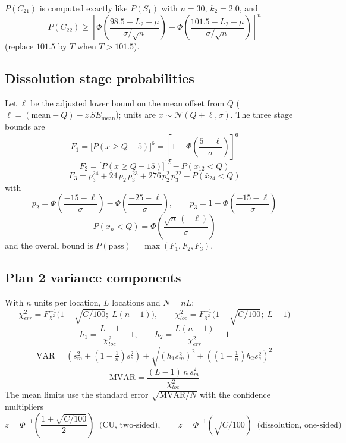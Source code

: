 \documentclass{article}
\begin{document}
$P(C_{21})$ is computed exactly like $P(S_1)$ with $n = 30$, $k_2 = 2.0$, and
$$P(C_{22}) \ge \left[ \Phi\!\left(\frac{98.5 + L_2 - \mu}{\sigma/\sqrt{n}}\right) - \Phi\!\left(\frac{101.5 - L_2 - \mu}{\sigma/\sqrt{n}}\right) \right]^{n}$$
(replace $101.5$ by $T$ when $T > 101.5$).

\subsection*{Dissolution stage probabilities}

Let $\ell$ be the adjusted lower bound on the mean offset from $Q$
($\ell = (\text{mean} - Q) - z\,SE_{\text{mean}}$); units are
$x \sim \mathcal{N}(Q + \ell, \sigma)$. The three stage bounds are
$$F_1 = \big[P(x \ge Q+5)\big]^6 = \left[1 - \Phi\!\left(\frac{5 - \ell}{\sigma}\right)\right]^6$$
$$F_2 = \big[P(x \ge Q-15)\big]^{12} - P(\bar{x}_{12} < Q)$$
$$F_3 = p_3^{24} + 24\,p_2\,p_3^{23} + 276\,p_2^2\,p_3^{22} - P(\bar{x}_{24} < Q)$$
with
$$p_2 = \Phi\!\left(\frac{-15 - \ell}{\sigma}\right) - \Phi\!\left(\frac{-25 - \ell}{\sigma}\right), \qquad p_3 = 1 - \Phi\!\left(\frac{-15 - \ell}{\sigma}\right)$$
$$P(\bar{x}_n < Q) = \Phi\!\left(\frac{\sqrt{n}\,(-\ell)}{\sigma}\right)$$
and the overall bound is $P(\text{pass}) = \max(F_1, F_2, F_3)$.

\subsection*{Plan 2 variance components}

With $n$ units per location, $L$ locations and $N = nL$:
$$\chi^2_{err} = F^{-1}_{\chi^2}\!\big(1-\sqrt{C/100};\; L(n-1)\big), \qquad \chi^2_{loc} = F^{-1}_{\chi^2}\!\big(1-\sqrt{C/100};\; L-1\big)$$
$$h_1 = \frac{L-1}{\chi^2_{loc}} - 1, \qquad h_2 = \frac{L(n-1)}{\chi^2_{err}} - 1$$
$$\mathrm{VAR} = \left(s_m^2 + \left(1-\tfrac{1}{n}\right)s_e^2\right) + \sqrt{\left(h_1 s_m^2\right)^2 + \left(\left(1-\tfrac{1}{n}\right)h_2 s_e^2\right)^2}$$
$$\mathrm{MVAR} = \frac{(L-1)\,n\,s_m^2}{\chi^2_{loc}}$$
The mean limits use the standard error $\sqrt{\mathrm{MVAR}/N}$ with the confidence multipliers
$$z = \Phi^{-1}\!\left(\frac{1+\sqrt{C/100}}{2}\right) \;\; \text{(CU, two-sided)}, \qquad z = \Phi^{-1}\!\left(\sqrt{C/100}\right) \;\; \text{(dissolution, one-sided)}$$
\end{document}
